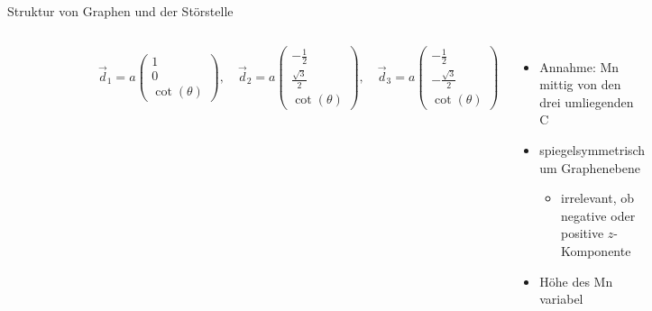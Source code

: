 \documentclass[aspectratio=1610, 9pt, xcolor=dvipsnames]{beamer}
\begin{document}
\begin{frame}{Struktur von Graphen und der Störstelle}
\begin{columns}
    \begin{figure}
      \centering
      \qquad
    \end{figure}
    \begin{equation*}
      \vec{d}_1 = a \begin{pmatrix} 1            \\[4pt] 0                   \\[2pt] \cot (\theta)\end{pmatrix}, \quad
      \vec{d}_2 = a \begin{pmatrix} -\frac{1}{2} \\[4pt] \frac{\sqrt{3}}{2}  \\[2pt] \cot (\theta)\end{pmatrix}, \quad 
      \vec{d}_3 = a \begin{pmatrix} -\frac{1}{2} \\[4pt] -\frac{\sqrt{3}}{2} \\[2pt] \cot (\theta)\end{pmatrix} 
    \end{equation*}
    \begin{itemize}
      \item Annahme: Mn mittig von den drei umliegenden C
      \item spiegelsymmetrisch um Graphenebene 
      \begin{itemize}
        \item[\textrightarrow] irrelevant, ob negative oder positive $z$-Komponente
      \end{itemize}
      \item Höhe des Mn variabel
    \end{itemize}
    \pause

\end{columns}
\end{frame}
\end{document}
